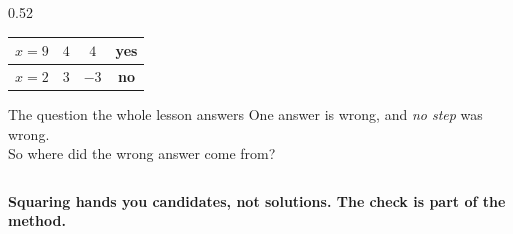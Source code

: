 \documentclass[aspectratio=169, 11pt]{beamer}
\begin{document}
\begin{frame}[t, plain]
\begin{columns}[T]
\begin{column}{0.52\textwidth}
\begin{center}
\begin{tabular}{|c|c|c|c|}
      $x=9$ & $4$ & $4$ & yes \\ \hline
      $x=2$ & $3$ & $-3$ & \textbf{no} \\ \hline
      \end{tabular}
      \end{center}
      \vspace{4pt}
      \begin{block}{The question the whole lesson answers}
        One answer is wrong, and \emph{no step} was wrong. \\[3pt]
        So where did the wrong answer come from?
      \end{block}
    \end{column}
  \end{columns}
  \vspace{2pt}
  \begin{center}
    \textbf{Squaring hands you candidates, not solutions. The check is part of the method.}
  \end{center}
\end{frame}
\end{document}
